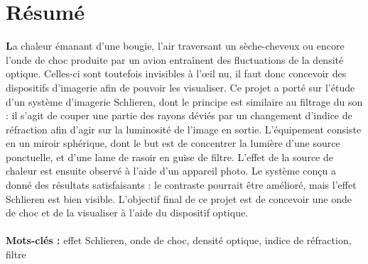 \section*{Résumé}
\small{\textbf{L}a chaleur émanant d’une bougie, l’air traversant un sèche-cheveux ou encore l’onde de choc produite par un avion entraînent des fluctuations de la densité optique. Celles-ci sont toutefois invisibles à l’œil nu, il faut donc concevoir des dispositifs d’imagerie afin de pouvoir les visualiser. Ce projet a porté sur l’étude d’un système d’imagerie Schlieren, dont le principe est similaire au filtrage du son : il s’agit de couper une partie des rayons déviés par un changement d’indice de réfraction afin d’agir sur la luminosité de l’image en sortie. L’équipement consiste en un miroir sphérique, dont le but est de concentrer la lumière d’une source ponctuelle, et d’une lame de rasoir en guise de filtre. L'effet de la source de chaleur est ensuite observé à l'aide d'un appareil photo. Le système conçu a donné des résultats satisfaisants : le contraste pourrait être amélioré, mais l'effet Schlieren est bien visible. L’objectif final de ce projet est de concevoir une onde de choc et de la visualiser à l'aide du dispositif optique.}
\\
\\
\small{\textbf{Mots-clés :} effet Schlieren, onde de choc, densité optique, indice de réfraction, filtre} 
